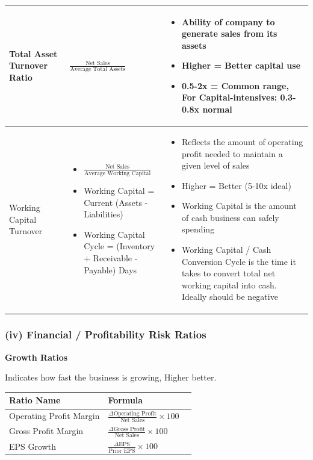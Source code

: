 \documentclass[12pt]{article}
\begin{document}
\begin{longtable}{|>{\raggedright\arraybackslash}m{4.5cm}|>{\raggedright\arraybackslash}m{5cm}|>{\raggedright\arraybackslash}m{6cm}|}
Total Asset Turnover Ratio & 
$\frac{\text{Net Sales}}{\text{Average Total Assets}}$ &
\begin{itemize}
\item Ability of company to generate sales from its assets
\item Higher = Better capital use
\item 0.5-2x = Common range, For Capital-intensives: 0.3-0.8x normal
\end{itemize} \\
\hline

Working Capital Turnover & 
\begin{itemize}
  \item $\frac{\text{Net Sales}}{\text{Average Working Capital}}$
  \item Working Capital = Current (Assets - Liabilities)
  \item Working Capital Cycle = (Inventory + Receivable - Payable) Days
\end{itemize} &
\begin{itemize}
\item Reflects the amount of operating profit needed to maintain a given level of sales
\item Higher = Better (5-10x ideal)
\item Working Capital is the amount of cash business can safely spending
\item Working Capital / Cash Conversion Cycle is the time it takes to convert total net working capital into cash. Ideally should be negative
\end{itemize} \\
\hline
\end{longtable}

\subsubsection*{(iv) Financial / Profitability Risk Ratios}

\textbf{Growth Ratios}

Indicates how fast the business is growing, Higher better.

\renewcommand{\arraystretch}{1.5}
\begin{longtable}{|>{\raggedright\arraybackslash}m{4.5cm}|>{\raggedright\arraybackslash}m{5cm}|>{\raggedright\arraybackslash}m{6cm}|}
\hline
\textbf{Ratio Name} & \textbf{Formula} \\
\hline

Operating Profit Margin & 
$\frac{\Delta \text{Operating Profit}}{\text{Net Sales}} \times 100$ \\
\hline

Gross Profit Margin & 
$\frac{\Delta \text{Gross Profit}}{\text{Net Sales}} \times 100$ \\
\hline

EPS Growth & 
$\frac{\Delta \text{EPS}}{\text{Prior EPS}} \times 100$ \\
\hline
\end{longtable}
\end{document}
